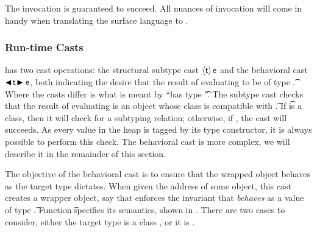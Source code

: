 \documentclass[USenglish]{tex/lipics-v2016}f
\begin{document}
\noindent The invocation is guaranteed to succeed. All nuances of invocation
will come in handy when translating the surface language to \kafka.

\subsubsection{Run-time Casts}

\kafka has two cast operations: the structural subtype cast $\SubCast\t\e$ and the
behavioral cast $\BehCast\t\e$, both indicating the desire that the result
of evaluating \e to be of type \t.  Where the casts differ is what is meant by
``has type \t''.  The subtype cast checks that the result of evaluating \e
is an object whose class is compatible with \t. If \t is a class, then it
will check for a subtyping relation; otherwise, if \EM{\t=\any}, the cast 
will succeeds. As every value in the heap is
tagged by its type constructor, it is always possible to perform this check. 
The behavioral cast is more complex, we will
describe it in the remainder of this section.

The objective of the behavioral cast is to ensure that the wrapped object
behaves as the target type dictates. When given the address \a of some
object, this cast creates a wrapper object, say \ap that enforces the 
invariant that \a \emph{behaves} as a
value of type \t.  Function \behcastE\a\t\s\K \Kp\ap\sp specifies its
semantics, shown in .  There are two cases to consider,
either the target type is a class \Cp, or it is \any.
\end{document}
